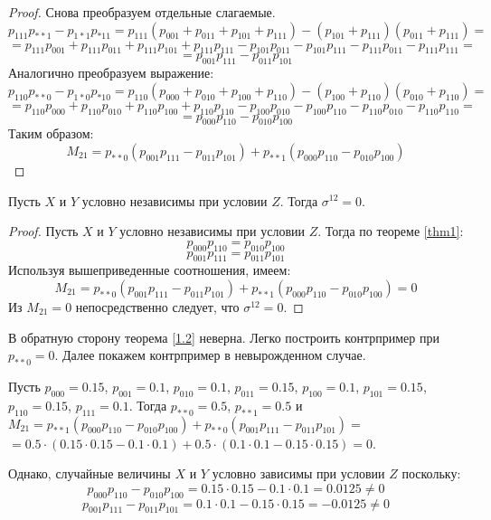 \begin{proof}
    Снова преобразуем отдельные слагаемые.
    $$
        p_{111}p_{**1}-p_{1*1}p_{*11} = p_{111}(p_{001}+p_{011}+p_{101}+p_{111})-
        (p_{101}+p_{111})(p_{011}+p_{111})=
    $$
    $$
        = p_{111}p_{001}+p_{111}p_{011}+p_{111}p_{101}+p_{111}p_{111}
        - p_{101}p_{011}-p_{101}p_{111}-p_{111}p_{011}-p_{111}p_{111}=
    $$
    $$
        = p_{001}p_{111}-p_{011}p_{101}
    $$
    Аналогично преобразуем выражение:
    $$
        p_{110}p_{**0}-p_{1*0}p_{*10}=
        p_{110}(p_{000}+p_{010}+p_{100}+p_{110})-(p_{100}+p_{110})(p_{010}+p_{110})=
    $$
    $$
        =p_{110}p_{000}+p_{110}p_{010}+p_{110}p_{100}+p_{110}p_{110}
        -p_{100}p_{010}-p_{100}p_{110}-p_{110}p_{010}-p_{110}p_{110}=
    $$
    $$
        =p_{000}p_{110}-p_{010}p_{100}
    $$
    Таким образом:
    $$
        M_{21} = p_{**0}(p_{001}p_{111}-p_{011}p_{101}) + p_{**1} (p_{000}p_{110}-p_{010}p_{100})
    $$
\end{proof}
\begin{theorem}\label{1.2}
    Пусть $X$ и $Y$ условно независимы при условии $Z$. Тогда $\sigma^{12}=0$.
\end{theorem}
\begin{proof}
    Пусть $X$ и $Y$ условно независимы при условии $Z$. Тогда по теореме \ref{thm1}:
    $$p_{000}p_{110}=p_{010}p_{100}$$
    $$p_{001}p_{111}=p_{011}p_{101}$$
    Используя вышеприведенные соотношения, имеем:
    $$
        M_{21} = p_{**0}(p_{001}p_{111}-p_{011}p_{101}) + p_{**1} (p_{000}p_{110}-p_{010}p_{100})= 0
    $$
    Из $M_{21}=0$ непосредственно следует, что $\sigma^{12}=0$.
\end{proof}
В обратную сторону теорема \ref{1.2} неверна. Легко построить контрпример при $p_{**0}=0$. Далее покажем контрпример в невырожденном случае.
\begin{example}
    Пусть $p_{000}=0.15$, $p_{001}=0.1$, $p_{010}=0.1$, $p_{011}=0.15$, $p_{100}=0.1$, $p_{101}=0.15$, $p_{110}=0.15$, $p_{111}=0.1$.
    Тогда $p_{**0}=0.5$, $p_{**1}=0.5$ и
    $M_{21} = p_{**1}(p_{000}p_{110}-p_{010}p_{100}) + p_{**0}(p_{001}p_{111}-p_{011}p_{101})=$
    $= 0.5 \cdot (0.15 \cdot 0.15 - 0.1 \cdot 0.1) + 0.5 \cdot (0.1 \cdot 0.1 - 0.15 \cdot 0.15) = 0$.

    Однако, случайные величины $X$ и $Y$ условно зависимы при условии $Z$ поскольку:
    $$
        p_{000}p_{110}-p_{010}p_{100}=0.15 \cdot 0.15 - 0.1 \cdot 0.1 = 0.0125 \neq 0
    $$
    $$
        p_{001}p_{111}-p_{011}p_{101}=0.1 \cdot 0.1 - 0.15 \cdot 0.15 = -0.0125 \neq 0
    $$
\end{example}
